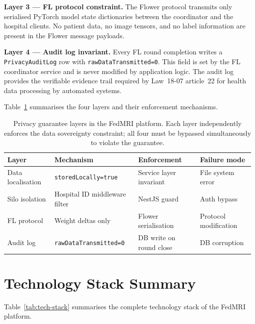 \textbf{Layer 3 — FL protocol constraint.}
The Flower protocol transmits only serialised PyTorch
model state dictionaries between the coordinator and
the hospital clients.
No patient data, no image tensors, and no label
information are present in the Flower message payloads.

\textbf{Layer 4 — Audit log invariant.}
Every FL round completion writes a
\texttt{PrivacyAuditLog} row with
\texttt{rawDataTransmitted=0}.
This field is set by the FL coordinator service and
is never modified by application logic.
The audit log provides the verifiable evidence trail
required by Law~18-07 article~22 for health data
processing by automated systems.

Table~\ref{tab:privacy-layers} summarises the four
layers and their enforcement mechanisms.

\begin{table}[htbp]
  \centering
  \caption[FedMRI privacy guarantee layers]{Privacy guarantee layers in the FedMRI
    platform. Each layer independently enforces the
    data sovereignty constraint; all four must be
    bypassed simultaneously to violate the guarantee.}
  \label{tab:privacy-layers}
  \renewcommand{\arraystretch}{1.3}
  \begin{tabular}{llll}
    \toprule
    \textbf{Layer} & \textbf{Mechanism}
      & \textbf{Enforcement} & \textbf{Failure mode} \\
    \midrule
    Data localisation
      & \texttt{storedLocally=true}
      & Service layer invariant
      & File system error \\
    Silo isolation
      & Hospital ID middleware filter
      & NestJS guard
      & Auth bypass \\
    FL protocol
      & Weight deltas only
      & Flower serialisation
      & Protocol modification \\
    Audit log
      & \texttt{rawDataTransmitted=0}
      & DB write on round close
      & DB corruption \\
    \bottomrule
  \end{tabular}
\end{table}


\section{Technology Stack Summary}
\label{app:stack}

Table~\ref{tab:tech-stack} summarises the complete
technology stack of the FedMRI platform.

